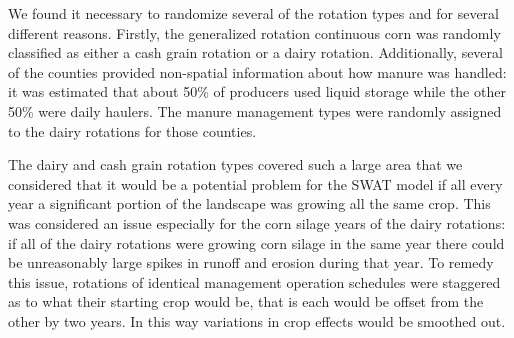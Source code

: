 
We found it necessary to randomize several of the rotation types and for several different reasons. Firstly, the generalized rotation continuous corn was randomly classified as either a cash grain rotation or a dairy rotation. Additionally, several of the counties provided non-spatial information about how manure was handled: it was estimated that about 50\% of producers used liquid storage while the other 50\% were daily haulers. The manure management types were randomly assigned to the dairy rotations for those counties.  

The dairy and cash grain rotation types covered such a large area that we considered that it would be a potential problem for the SWAT model if all every year a significant portion of the landscape was growing all the same crop. This was considered an issue especially for the corn silage years of the dairy rotations: if all of the dairy rotations were growing corn silage in the same year there could be unreasonably large spikes in runoff and erosion during that year. To remedy this issue, rotations of identical management operation schedules were staggered as to what their starting crop would be, that is each would be offset from the other by two years. In this way variations in crop effects would be smoothed out.